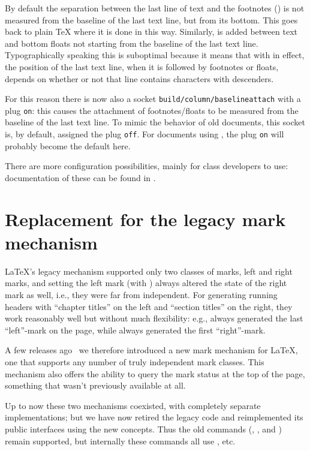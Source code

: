 \documentclass{ltnews}
\providecommand\socket[1]{\texttt{#1}}
\providecommand\plug[1]{\texttt{#1}}
\begin{document}
By default the separation between the last line of text and the
footnotes () is not measured from the baseline of
the last text line, but from its bottom. This goes back to plain
\TeX{} where it is done in this way.  Similarly,  is
added between text and bottom floats not starting from the baseline of
the last text line. Typographically speaking this is suboptimal
because it means that with  in effect, the position of
the last text line, when it is followed by footnotes or floats,
depends on whether or not that line contains characters with
descenders.

For this reason there is now also a socket
\socket{build/column/baselineattach} with a plug \plug{on}: this
causes the attachment of footnotes/floats to be measured from the
baseline of the last text line. To mimic the behavior of old
documents, this socket is, by default, assigned the plug \plug{off}.
For documents using , the plug \plug{on} will
probably become the default here.

There are more configuration possibilities, mainly for class
developers to use: documentation of these can be found in \cite[\S54
  ltoutput.dtx]{41:source2e}.


\section{Replacement for the legacy mark mechanism}

\LaTeX{}'s legacy mechanism supported only two classes of marks, left
and right marks, and setting the left mark (with ) always
altered the state of the right mark as well, i.e., they were far from
independent. For generating running headers with \enquote{chapter
  titles} on the left and \enquote{section titles} on the right, they
work reasonably well but without much flexibility: e.g., 
always generated the last \enquote{left}-mark on the page, while
 always generated the first \enquote{right}-mark.

A few releases ago~\cite[p.\,76]{41:ltnews} we therefore introduced a
new mark mechanism for \LaTeX{}, one that supports any number of truly
independent mark classes. This mechanism also offers the ability to
query the mark status at the top of the page, something that wasn't
previously available at all.

Up to now these two mechanisms coexisted, with completely separate
implementations; but we have now retired the legacy code and
reimplemented its public interfaces using the new concepts.  Thus
the old commands (, ,  and
) remain supported, but internally these commands all
use , etc.
\end{document}
